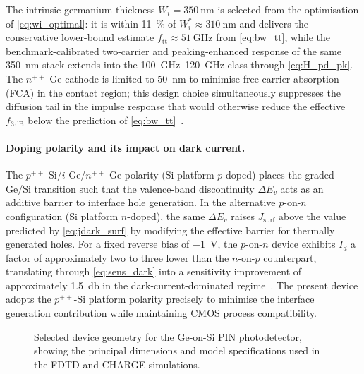 The intrinsic germanium thickness $W_i=\SI{350}{\nano\metre}$ is selected from
the optimisation of \cref{eq:wi_optimal}: it is within \SI{11}{\percent} of
$W_i^*\approx\SI{310}{\nano\metre}$ and delivers the conservative lower-bound
estimate $f_{\mathrm{tt}}\approx\SI{51}{\giga\hertz}$ from \cref{eq:bw_tt},
while the benchmark-calibrated two-carrier and peaking-enhanced response of the
same \SI{350}{\nano\metre} stack extends into the \SIrange{100}{120}{\giga\hertz}
class through \cref{eq:H_pd_pk}. The $n^{++}$-Ge cathode is limited to
\SI{50}{\nano\metre} to minimise free-carrier absorption (FCA) in the contact
region; this design choice simultaneously suppresses the diffusion tail in the
impulse response that would otherwise reduce the effective $f_{3\,\mathrm{dB}}$
below the prediction of \cref{eq:bw_tt}~\cite{Yan2024}.

\paragraph{Doping polarity and its impact on dark current.}
\label{subsec:pd_polarity}
The $p^{++}$-Si/$i$-Ge/$n^{++}$-Ge polarity (Si platform $p$-doped) places the
graded Ge/Si transition such that the valence-band discontinuity $\Delta E_v$
acts as an additive barrier to interface hole generation. In the alternative
$p$-on-$n$ configuration (Si platform $n$-doped), the same $\Delta E_v$ raises
$J_{\mathrm{surf}}$ above the value predicted by \cref{eq:jdark_surf} by modifying
the effective barrier for thermally generated holes. For a fixed reverse bias of
\SI{-1}{\volt}, the $p$-on-$n$ device exhibits $I_d$ a factor of approximately
two to three lower than the $n$-on-$p$ counterpart, translating through
\cref{eq:sens_dark} into a sensitivity improvement of approximately
\SI{1.5}{\decibel} in the dark-current-dominated regime~\cite{Alasio2024}.
The present device adopts the $p^{++}$-Si platform polarity precisely to
minimise the interface generation contribution while maintaining CMOS process
compatibility.

\begin{figure}[H]
    \centering
    \caption{Selected device geometry for the Ge-on-Si PIN photodetector,
    showing the principal dimensions and model specifications used in the FDTD
    and CHARGE simulations.}
    \label{fig:design_dimensions}
\end{figure}

